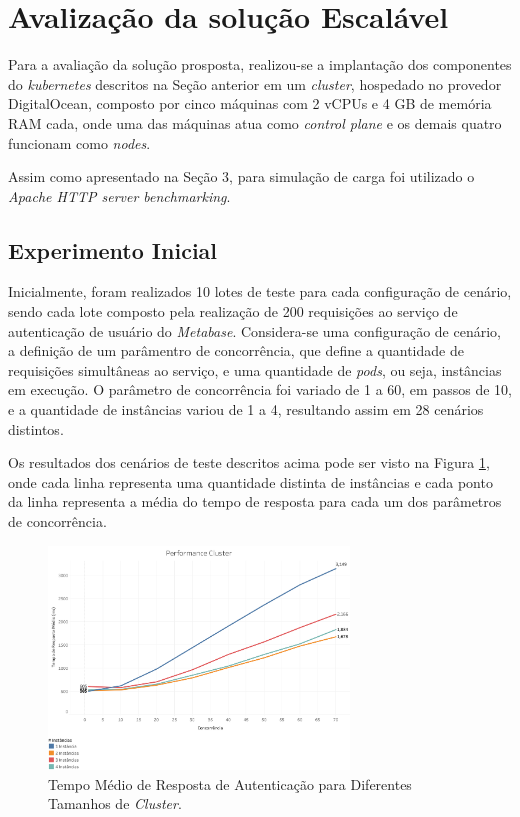 \section{Avalização da solução Escalável}

Para a avaliação da solução prosposta, realizou-se a implantação dos componentes do \textit{kubernetes} descritos na Seção anterior em um \textit{cluster}, hospedado no provedor DigitalOcean, composto por cinco máquinas com 2 vCPUs e 4 GB de memória RAM cada, onde uma das máquinas atua como \textit{control plane} e os demais quatro funcionam como \textit{nodes}.

Assim como apresentado na Seção 3, para simulação de carga foi utilizado o \textit{Apache HTTP server benchmarking}. 

\subsection{Experimento Inicial}

Inicialmente, foram realizados 10 lotes de teste para cada configuração de cenário, sendo cada lote composto pela realização de 200 requisições ao serviço de autenticação de usuário do \textit{Metabase}. Considera-se uma configuração de cenário, a definição de um parâmentro de concorrência, que define a quantidade de requisições simultâneas ao serviço, e uma quantidade de \textit{pods}, ou seja, instâncias em execução. O parâmetro de concorrência foi variado de 1 a 60, em passos de 10, e a quantidade de instâncias variou de 1 a 4, resultando assim em 28 cenários distintos.

Os resultados dos cenários de teste descritos acima pode ser visto na Figura \ref{fig.avg-resp-time-cluster}, onde cada linha representa uma quantidade distinta de instâncias e cada ponto da linha representa a média do tempo de resposta para cada um dos parâmetros de concorrência.

\begin{figure}[htp]
   \centering
    \includegraphics[width=8cm]{Imagens/Performance-Cluster}
    \caption{Tempo Médio de Resposta de Autenticação para Diferentes Tamanhos de \textit{Cluster}.}
    \label{fig.avg-resp-time-cluster}
\end{figure} 

